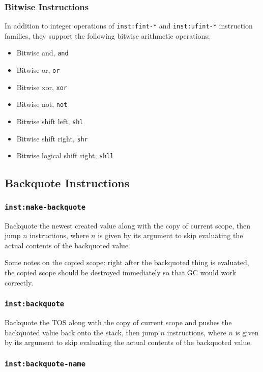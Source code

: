 \documentclass{article}
\newcommand{\inst}[1] {\texttt{inst:#1}}
\begin{document}
\subsubsection{Bitwise Instructions}

In addition to integer operations of \inst{fint-*} and \inst{ufint-*} instruction families, they support the following bitwise arithmetic operations:
\begin{itemize}
\item Bitwise and, \texttt{and}
\item Bitwise or, \texttt{or}
\item Bitwise xor, \texttt{xor}
\item Bitwise not, \texttt{not}
\item Bitwise shift left, \texttt{shl}
\item Bitwise shift right, \texttt{shr}
\item Bitwise logical shift right, \texttt{shll}
\end{itemize}

\subsection{Backquote Instructions}

\subsubsection{\inst{make-backquote}}

Backquote the newest created value along with the copy of current scope, then jump $n$ instructions, where $n$ is given by its argument to skip evaluating the actual contents of the backquoted value.

Some notes on the copied scope: right after the backquoted thing is evaluated, the copied scope should be destroyed immediately so that GC would work correctly.

\subsubsection{\inst{backquote}}

Backquote the TOS along with the copy of current scope and pushes the backquoted value back onto the stack, then jump $n$ instructions, where $n$ is given by its argument to skip evaluating the actual contents of the backquoted value.


\subsubsection{\inst{backquote-name}}
\end{document}
